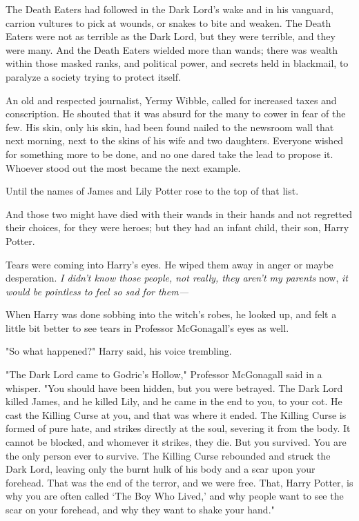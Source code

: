 The Death Eaters had followed in the Dark Lord's wake and in his vanguard,
carrion vultures to pick at wounds, or snakes to bite and weaken. The Death
Eaters were not as terrible as the Dark Lord, but they were terrible, and they
were many. And the Death Eaters wielded more than wands; there was wealth
within those masked ranks, and political power, and secrets held in blackmail,
to paralyze a society trying to protect itself.

An old and respected journalist, Yermy Wibble, called for increased taxes and
conscription. He shouted that it was absurd for the many to cower in fear of
the few. His skin, only his skin, had been found nailed to the newsroom wall
that next morning, next to the skins of his wife and two daughters. Everyone
wished for something more to be done, and no one dared take the lead to propose
it. Whoever stood out the most became the next example.

Until the names of James and Lily Potter rose to the top of that list.

And those two might have died with their wands in their hands and not regretted
their choices, for they were heroes; but they had an infant
child, their son, Harry Potter.

Tears were coming into Harry's eyes. He wiped them away in anger or maybe
desperation. \emph{I didn't know those people, not really, they aren't my
parents} now, \emph{it would be pointless to feel so sad for them—}

When Harry was done sobbing into the witch's robes, he looked up, and felt a
little bit better to see tears in Professor McGonagall's eyes as well.

"So what happened?" Harry said, his voice trembling.

"The Dark Lord came to Godric's Hollow," Professor McGonagall said in a
whisper. "You should have been hidden, but you were betrayed. The Dark Lord
killed James, and he killed Lily, and he came in the end to you, to your cot.
He cast the Killing Curse at you, and that was where it ended. The Killing
Curse is formed of pure hate, and strikes directly at the soul, severing it
from the body. It cannot be blocked, and whomever it strikes, they die. But you
survived. You are the only person ever to survive. The Killing Curse rebounded
and struck the Dark Lord, leaving only the burnt hulk of his body and a scar
upon your forehead. That was the end of the terror, and we were free. That,
Harry Potter, is why you are often called `The Boy Who Lived,'
and why people want to see the scar on your forehead, and why they
want to shake your hand."

